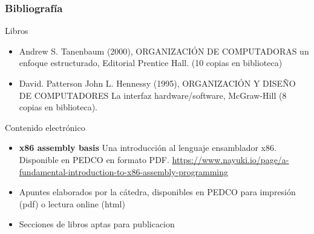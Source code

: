 \documentclass[aspectratio=169,compress]{beamer}
\begin{document}
\begin{footnotesize}
\begin{frame}
 \frametitle{Bibliografía}
Libros
\begin{itemize}
\item Andrew S. Tanenbaum (2000), ORGANIZACIÓN DE COMPUTADORAS un enfoque estructurado, Editorial Prentice Hall. (10 copias en biblioteca)
\item David. Patterson John L. Hennessy (1995), ORGANIZACIÓN Y DISEÑO DE COMPUTADORES La interfaz hardware/software, McGraw-Hill (8 copias en biblioteca).
\end{itemize}
Contenido electrónico
\begin{itemize}
	\item \textbf{x86 assembly basis} Una introducción al lenguaje ensamblador x86. Disponible en PEDCO en formato PDF.
		\url{https://www.nayuki.io/page/a-fundamental-introduction-to-x86-assembly-programming}
\item Apuntes elaborados por la cátedra, disponibles en PEDCO para impresión (pdf) o lectura online (html)
\item Secciones de libros aptas para publicacion
\end{itemize}
\end{frame}

\end{footnotesize}
\end{document}
